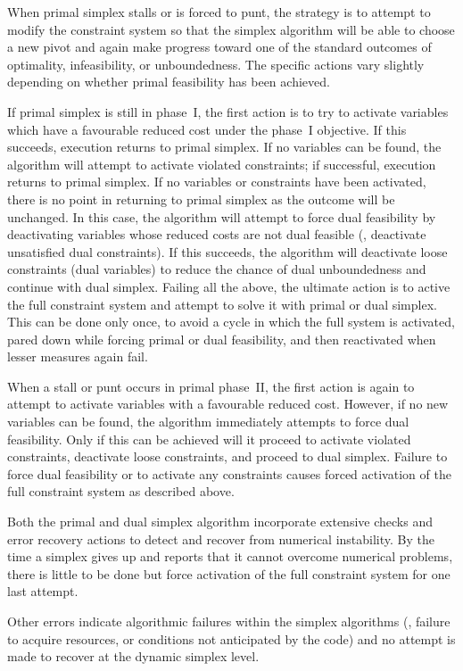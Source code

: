 When primal simplex stalls or is forced to punt, the strategy is to attempt to
modify the constraint system so that the simplex algorithm will be able to
choose a new pivot and again make progress toward one of the standard outcomes
of optimality, infeasibility, or unboundedness.
The specific actions vary slightly depending on whether primal feasibility has
been achieved.

If primal simplex is still in phase~I, the first action is to try to activate
variables which have a favourable reduced cost under the phase~I objective.
If this succeeds, execution returns to primal simplex.
If no variables can be found, the algorithm will attempt to activate violated
constraints; if successful, execution returns to primal simplex.
If no variables or constraints have been activated, there is no point in
returning to primal simplex as the outcome will be unchanged.
In this case, the algorithm will attempt to force dual feasibility by
deactivating variables whose reduced costs are not dual feasible (\ie,
deactivate unsatisfied dual constraints).
If this succeeds, the algorithm will deactivate loose constraints (dual
variables) to reduce the chance of dual unboundedness and continue with dual
simplex.
Failing all the above, the ultimate action is to active the full constraint
system and attempt to solve it with primal or dual simplex.
This can be done only once, to avoid a cycle in which the full system is
activated, pared down while forcing primal or dual feasibility, and then
reactivated when lesser measures again fail.

When a stall or punt occurs in primal phase~II, the first action is again to
attempt to activate variables with a favourable reduced cost.
However, if no new variables can be found, the algorithm immediately attempts
to force dual feasibility.
Only if this can be achieved will it proceed to activate violated constraints,
deactivate loose constraints, and proceed to dual simplex.
Failure to force dual feasibility or to activate any constraints causes forced
activation of the full constraint system as described above.

Both the primal and dual simplex algorithm incorporate extensive checks and
error recovery actions to detect and recover from numerical instability.
By the time a simplex gives up and reports that it cannot overcome numerical
problems, there is little to be done but force activation of the full
constraint system for one last attempt.

Other errors indicate algorithmic failures within the simplex algorithms (\eg,
failure to acquire resources, or conditions not anticipated by the code)
and no attempt is made to recover at the dynamic simplex level.

